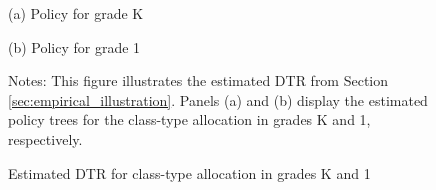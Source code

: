 \begin{figure}[h]
\caption{Estimated DTR for class-type allocation in grades K and 1} \label{fig:estimated_decision_trees}
\vspace{.5cm}
\begin{minipage}[t]{0.44\hsize}
\begin{center}

{\small  (a) Policy for grade K} \\
\vspace{0.5cm}
 

\end{center}
\end{minipage}
\begin{minipage}[t]{0.44\hsize}
\begin{center}
{\small (b) Policy for grade 1} \\
\vspace{.5cm}

\end{center}
\end{minipage}

\vspace{.3cm}
\begin{tablenotes}\footnotesize
\item[] Notes: This figure illustrates the estimated DTR from Section \ref{sec:empirical_illustration}. Panels (a) and (b) display the estimated policy trees for the class-type allocation in grades K and 1, respectively.
\end{tablenotes}
\end{figure}
\medskip






